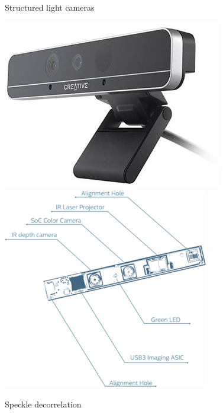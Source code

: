 \documentclass[compress]{beamer}
\begin{document}
\begin{frame}{Structured light cameras}
    \begin{center}
        \includegraphics[width=0.4\linewidth]{f200}
        \includegraphics[width=0.6\linewidth]{f200_module}
    \end{center}
\end{frame}


{
\begin{frame}{Speckle decorrelation}


\end{frame}
}

\end{document}
